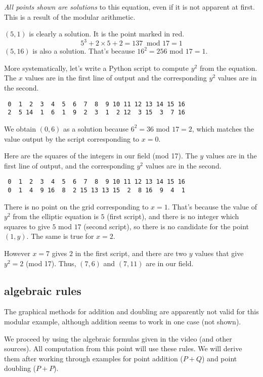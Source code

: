 \documentclass[11pt, oneside]{article}
\begin{document}
\emph{All points shown are solutions} to this equation, even if it is not apparent at first.  This is a result of the modular arithmetic. 

$(5,1)$ is clearly a solution.  It is the point marked in red.  
\[ 5^3 + 2 \times 5 + 2 = 137 \ \text{ mod } 17 = 1 \]
$(5,16)$ is also a solution.  That's because $16^2 = 256$ mod $17 = 1$.

More systematically, let's write a Python script to compute $y^2$ from the equation.  The $x$ values are in the first line of output and the corresponding $y^2$ values are in the second.
\begin{verbatim}
 0  1  2  3  4  5  6  7  8  9 10 11 12 13 14 15 16
 2  5 14  1  6  1  9  2  3  1  2 12  3 15  3  7 16
\end{verbatim}
We obtain $(0,6)$ as a solution because $6^2 = 36$ mod $17 = 2$, which matches the value output by the script corresponding to $x = 0$.

Here are the squares of the integers in our field (mod 17).  The $y$ values are in the first line of output, and the corresponding $y^2$ values are in the second.
\begin{verbatim}
 0  1  2  3  4  5  6  7  8  9 10 11 12 13 14 15 16
 0  1  4  9 16  8  2 15 13 13 15  2  8 16  9  4  1
\end{verbatim}

There is no point on the grid corresponding to $x = 1$. That's because the value of $y^2$ from the elliptic equation is $5$ (first script), and there is no integer which squares to give $5$ mod $17$ (second script), so there is no candidate for the point $(1,y)$.  The same is true for $x=2$.  

However $x = 7$ gives $2$ in the first script, and there are two $y$ values that give $y^2 = 2$ (mod 17).  Thus, $(7,6)$ and $(7,11)$ are in our field.

\subsection*{algebraic rules}
The graphical methods for addition and doubling are apparently not valid for this modular example, although addition seems to work in one case (not shown).

We proceed by using the algebraic formulas given in the video (and other sources).  All computation from this point will use these rules.  We will derive them after working through examples for point addition ($P + Q$) and point doubling ($P + P$).
\end{document}
